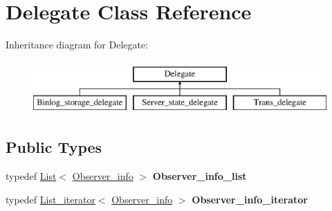 \hypertarget{classDelegate}{}\section{Delegate Class Reference}
\label{classDelegate}
Inheritance diagram for Delegate\+:\begin{figure}[H]
\begin{center}
\leavevmode
\includegraphics[height=2.000000cm]{classDelegate}
\end{center}
\end{figure}
\subsection*{Public Types}
\begin{DoxyCompactItemize}
\item 
\mbox{\label{classDelegate_af13c700892264600fabac4ca61d6df0a}} 
typedef \mbox{\hyperlink{classList}{List}}$<$ \mbox{\hyperlink{classObserver__info}{Observer\+\_\+info}} $>$ {\bfseries Observer\+\_\+info\+\_\+list}
\item 
\mbox{\label{classDelegate_a6df2ef4fc5e61975b3eb583be2b91314}} 
typedef \mbox{\hyperlink{classList__iterator}{List\+\_\+iterator}}$<$ \mbox{\hyperlink{classObserver__info}{Observer\+\_\+info}} $>$ {\bfseries Observer\+\_\+info\+\_\+iterator}
\end{DoxyCompactItemize}

